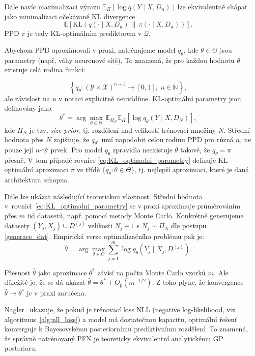Dále navíc maximalizaci výrazu $\mathbb{E}_\Pi[\log q(Y \mid X, D_n)]$ lze ekvivalentně chápat jako minimalizaci očekávané KL divergence
$$\mathbb{E}\!\left[\mathrm{KL}\!\left(q(\cdot \mid X, D_n) \,\Big\|\, \pi(\cdot \mid X, D_n)\right)\right].$$
PPD $\pi$ je tedy KL-optimálním prediktorem v $\mathcal{Q}$.

Abychom PPD aproximovali v praxi, natrénujeme model $q_\theta$, kde $\theta \in \Theta$ jsou parametry (např. váhy neuronové sítě). 
To znamená, že pro každou hodnotu $\theta$ existuje celá rodina funkcí:

$$\left\{q_{\theta} : (\mathcal{Y} \times \mathcal{X})^{n+1} \to [0,1],\; n \in \mathbb{N}\right\},$$
ale závislost na $n$ v notaci explicitně neuvádíme. 
KL-optimální parametry jsou definovány jako:
\begin{equation}
    \theta^* = \arg\max_{\theta \in \Theta} \, \mathbb{E}_{\Pi_N} \mathbb{E}_\Pi[\log q_\theta(Y \mid X, D_N)],
\label{eq:KL_optimalni_parametry}
\end{equation}
kde $\Pi_N$ je tzv. \textit{size prior}, tj. rozdělení nad velikostí trénovací množiny $N$. 
Střední hodnota přes $N$ zajišťuje, že $q_{\theta^*}$ umí napodobit celou rodinu PPD pro různá $n$, ne pouze její $n$-tý prvek.
Pro model $q_\theta$ zpravidla neexistuje $\theta$ takové, že $q_\theta = \pi$ přesně. 
V tom případě rovnice \ref{eq:KL_optimalni_parametry} definuje KL-optimální aproximaci $\pi$ ve třídě $\{q_\theta : \theta \in \Theta\}$, tj. nejlepší aproximaci, které je daná architektura schopna.

Dále lze ukázat následující teoretickou vlastnost.
Střední hodnota v~rovnici~\ref{eq:KL_optimalni_parametry} se v praxi aproximuje průměrováním přes $m$ iid datasetů, např. pomocí metody Monte Carlo.
Konkrétně generujeme datasety $(Y_j, X_j) \cup D^{(j)}$ velikosti $N_j + 1$ s $N_j \sim \Pi_N$ dle postupu \ref{generace_dat}. 
Empirická verze optimalizačního problému pak je:
\begin{equation}
    \hat{\theta} = \arg\max_{\theta \in \Theta} \sum_{j=1}^{m} \log q_\theta(Y_j \mid X_j, D^{(j)}). 
\label{optimalni_theta_empiricky}
\end{equation}

Přesnost $\hat{\theta}$ jako aproximace $\theta^*$ závisí na počtu Monte Carlo vzorků $m$.
Ale důležité je, že se dá ukázat $\hat{\theta} = \theta^* + O_p(m^{-1/2})$.
Z toho plyne, že konvergence $\hat{\theta} \to \theta^*$ je v praxi zaručena.

Nagler~\cite{nagler2023} ukazuje, že pokud je trénovací loss NLL (negative log-likelihood, viz algoritmus~\ref{alg:nll_loss}) a model má dostatečnou kapacitu, optimální řešení konverguje k Bayesovskému posteriornímu prediktivnímu rozdělení. To znamená, že správně natrénovaný PFN je teoreticky ekvivalentní analytickému GP posterioru.


